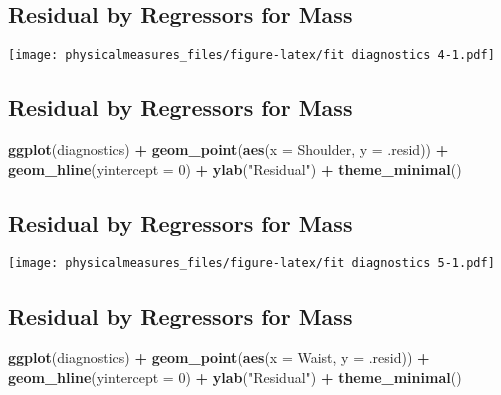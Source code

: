 \documentclass[]{article}
\newenvironment{Shaded}{\begin{snugshade}}{\end{snugshade}}
\newcommand{\KeywordTok}[1]{\textcolor[rgb]{0.13,0.29,0.53}{\textbf{#1}}}
\newcommand{\DataTypeTok}[1]{\textcolor[rgb]{0.13,0.29,0.53}{#1}}
\newcommand{\DecValTok}[1]{\textcolor[rgb]{0.00,0.00,0.81}{#1}}
\newcommand{\StringTok}[1]{\textcolor[rgb]{0.31,0.60,0.02}{#1}}
\newcommand{\OperatorTok}[1]{\textcolor[rgb]{0.81,0.36,0.00}{\textbf{#1}}}
\newcommand{\NormalTok}[1]{#1}
\begin{document}
\subsection{Residual by Regressors for
Mass}\label{residual-by-regressors-for-mass-7}

\texttt{[image: physicalmeasures\_files/figure-latex/fit diagnostics 4-1.pdf]}

\subsection{Residual by Regressors for
Mass}\label{residual-by-regressors-for-mass-8}

\begin{Shaded}
\begin{Highlighting}[]
\KeywordTok{ggplot}\NormalTok{(diagnostics) }\OperatorTok{+}
\StringTok{  }\KeywordTok{geom_point}\NormalTok{(}\KeywordTok{aes}\NormalTok{(}\DataTypeTok{x =}\NormalTok{ Shoulder, }\DataTypeTok{y =}\NormalTok{ .resid)) }\OperatorTok{+}
\StringTok{  }\KeywordTok{geom_hline}\NormalTok{(}\DataTypeTok{yintercept =} \DecValTok{0}\NormalTok{) }\OperatorTok{+}
\StringTok{  }\KeywordTok{ylab}\NormalTok{(}\StringTok{"Residual"}\NormalTok{) }\OperatorTok{+}
\StringTok{  }\KeywordTok{theme_minimal}\NormalTok{()}
\end{Highlighting}
\end{Shaded}

\subsection{Residual by Regressors for
Mass}\label{residual-by-regressors-for-mass-9}

\texttt{[image: physicalmeasures\_files/figure-latex/fit diagnostics 5-1.pdf]}

\subsection{Residual by Regressors for
Mass}\label{residual-by-regressors-for-mass-10}

\begin{Shaded}
\begin{Highlighting}[]
\KeywordTok{ggplot}\NormalTok{(diagnostics) }\OperatorTok{+}
\StringTok{  }\KeywordTok{geom_point}\NormalTok{(}\KeywordTok{aes}\NormalTok{(}\DataTypeTok{x =}\NormalTok{ Waist, }\DataTypeTok{y =}\NormalTok{ .resid)) }\OperatorTok{+}
\StringTok{  }\KeywordTok{geom_hline}\NormalTok{(}\DataTypeTok{yintercept =} \DecValTok{0}\NormalTok{) }\OperatorTok{+}
\StringTok{  }\KeywordTok{ylab}\NormalTok{(}\StringTok{"Residual"}\NormalTok{) }\OperatorTok{+}
\StringTok{  }\KeywordTok{theme_minimal}\NormalTok{()}
\end{Highlighting}
\end{Shaded}
\end{document}
